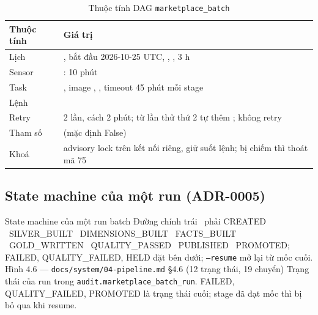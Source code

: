 \begin{xltabular}{\linewidth}{@{}L{24mm}Y@{}}
  \caption{Thuộc tính DAG \texttt{marketplace\_batch}}\label{tab:dag-batch}\\
  \toprule
  \textbf{Thuộc tính} & \textbf{Giá trị} \\
  \midrule
  Lịch & , bắt đầu 2026-10-25 UTC, , ,  3 h \\
  Sensor & :  10 phút \\
  Task & , image , , timeout 45 phút mỗi stage \\
  Lệnh &  \\
  Retry & 2 lần, cách 2 phút; từ lần thử thứ 2 tự thêm ;  không retry \\
  Tham số &  (mặc định False) \\
  Khoá & advisory lock  trên kết nối riêng, giữ suốt lệnh; bị chiếm thì thoát mã 75 \\
  \bottomrule
\end{xltabular}

\subsection{State machine của một run (ADR-0005)}
  {State machine của một run batch}
  {Đường chính trái \ra\ phải CREATED \ra\ SILVER\_BUILT \ra\ DIMENSIONS\_BUILT \ra\ FACTS\_BUILT \ra\ GOLD\_WRITTEN \ra\ QUALITY\_PASSED \ra\ PUBLISHED \ra\ PROMOTED; FAILED, QUALITY\_FAILED, HELD đặt bên dưới; \texttt{--resume} mở lại từ mốc cuối.}
  {Hình 4.6 — \texttt{docs/system/04-pipeline.md} §4.6 (12 trạng thái, 19 chuyển)}
  {Trạng thái của run trong \texttt{audit.marketplace\_batch\_run}. FAILED, QUALITY\_FAILED, PROMOTED là trạng thái cuối; stage đã đạt mốc thì bị bỏ qua khi resume.}

